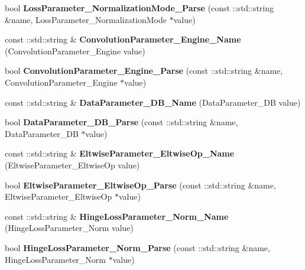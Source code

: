 \begin{DoxyCompactItemize}
bool {\bfseries Loss\+Parameter\+\_\+\+Normalization\+Mode\+\_\+\+Parse} (const \+::std\+::string \&name, Loss\+Parameter\+\_\+\+Normalization\+Mode $\ast$value)
\item 
\mbox{\label{namespacecaffe_ab1dc4dad41a8bad63a9b607551d85250}} 
const \+::std\+::string \& {\bfseries Convolution\+Parameter\+\_\+\+Engine\+\_\+\+Name} (Convolution\+Parameter\+\_\+\+Engine value)
\item 
\mbox{\label{namespacecaffe_a36e1505159b60eede27ae548181ba82e}} 
bool {\bfseries Convolution\+Parameter\+\_\+\+Engine\+\_\+\+Parse} (const \+::std\+::string \&name, Convolution\+Parameter\+\_\+\+Engine $\ast$value)
\item 
\mbox{\label{namespacecaffe_aa24d43442ec9f35c1958806e8e93d00d}} 
const \+::std\+::string \& {\bfseries Data\+Parameter\+\_\+\+D\+B\+\_\+\+Name} (Data\+Parameter\+\_\+\+DB value)
\item 
\mbox{\label{namespacecaffe_ae528b3c451257ec9246b448471547c61}} 
bool {\bfseries Data\+Parameter\+\_\+\+D\+B\+\_\+\+Parse} (const \+::std\+::string \&name, Data\+Parameter\+\_\+\+DB $\ast$value)
\item 
\mbox{\label{namespacecaffe_ac395a3284ce8e51399dfbc3419f1f26c}} 
const \+::std\+::string \& {\bfseries Eltwise\+Parameter\+\_\+\+Eltwise\+Op\+\_\+\+Name} (Eltwise\+Parameter\+\_\+\+Eltwise\+Op value)
\item 
\mbox{\label{namespacecaffe_a70a57dd71e0acd97d60219bdf98dc350}} 
bool {\bfseries Eltwise\+Parameter\+\_\+\+Eltwise\+Op\+\_\+\+Parse} (const \+::std\+::string \&name, Eltwise\+Parameter\+\_\+\+Eltwise\+Op $\ast$value)
\item 
\mbox{\label{namespacecaffe_a6815f018ca4f518ec245e8889d528ccd}} 
const \+::std\+::string \& {\bfseries Hinge\+Loss\+Parameter\+\_\+\+Norm\+\_\+\+Name} (Hinge\+Loss\+Parameter\+\_\+\+Norm value)
\item 
\mbox{\label{namespacecaffe_a8bd563faf2a11432e6d849b15c662a92}} 
bool {\bfseries Hinge\+Loss\+Parameter\+\_\+\+Norm\+\_\+\+Parse} (const \+::std\+::string \&name, Hinge\+Loss\+Parameter\+\_\+\+Norm $\ast$value)

\end{DoxyCompactItemize}
